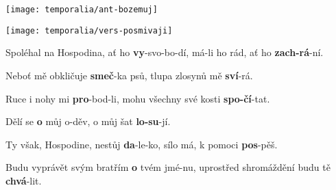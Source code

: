 \documentclass[a4paper, twoside, 12pt]{article}
\begin{document}
\trGloriaLausV {}

\vfill
\pagebreak


 


\trIngrediente

\vspace{4mm}


\noindent \texttt{[image: temporalia/ant-bozemuj]}

\noindent \texttt{[image: temporalia/vers-posmivaji]}

 Spoléhal na Hospodina, ať ho \textbf{vy}-svo-bo-dí, \hspace{2.5mm} má-li ho rád, ať ho \hspace{7.5mm} \textbf{zach-rá}-ní.~\Rbardot{}

 Neboť mě obkličuje \hspace{14mm} \textbf{smeč}-ka psů, \hspace{3mm} tlupa zlosynů mě \hspace{10.5mm} \textbf{sví}-rá.

 Ruce i nohy mi \hspace{21mm} \textbf{pro}-bod-li, \hspace{5mm} mohu všechny své kosti \hspace{1mm} \textbf{spo-čí}-tat.~\Rbardot{}

 Dělí se \hspace{34mm} \textbf{o} můj o-děv, \hspace{3mm} o můj šat \hspace{22mm} \textbf{lo-su}-jí.

 Ty však, Hospodine, nestůj \hspace{4mm} \textbf{da}-le-ko, \hspace{8mm} sílo má, k pomoci \hspace{10mm} \textbf{pos}-pěš.~\Rbardot{}

 Budu vyprávět svým bratřím \hspace{2mm} \textbf{o} tvém jmé-nu, uprostřed shromáždění budu tě \textbf{chvá}-lit.
\end{document}

